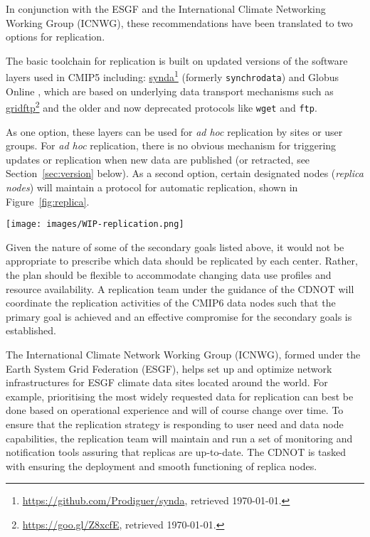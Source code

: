 \documentclass[gmd,manuscript]{copernicus}
\newcommand{\urlref}[2] {\href{#1}{#2}\footnote{\url{#1}, retrieved \today.}}
\begin{document}
In conjunction with the ESGF and the International Climate Networking
Working Group (ICNWG), these recommendations have been translated to
two options for replication.

The basic toolchain for replication is built on updated versions of
the software layers used in CMIP5 including:
\urlref{https://github.com/Prodiguer/synda}{synda} (formerly
\texttt{synchrodata}) and Globus Online \citep{ref:chardetal2015}, which
are based on underlying data transport mechanisms such as
\urlref{https://goo.gl/Z8xcfE}{gridftp} and the older and now deprecated
protocols like \texttt{wget} and \texttt{ftp}.

As one option, these layers can be used for \emph{ad hoc} replication by
sites or user groups. For \emph{ad hoc} replication, there is no
obvious mechanism for triggering updates or replication when new data
are published (or retracted, see Section~\ref{sec:version} below).
As a second option, certain designated nodes (\emph{replica nodes}) will maintain a protocol
for automatic replication, shown in Figure~\ref{fig:replica}.

\begin{figure*}
  \begin{center}
    \texttt{[image: images/WIP-replication.png]}
  \end{center}
  \caption{CMIP6 replication from data nodes to replica centers and
    between replica centers coordinated by a CMIP6 replication team,
    under the guidance of the CDNOT.}
  \label{fig:replica}
\end{figure*}

Given the nature of some of the secondary goals listed above, it would
not be appropriate to prescribe which data should be replicated by
each center. Rather, the plan should be flexible to accommodate
changing data use profiles and resource availability.
A replication team under the guidance of the CDNOT will coordinate the
replication activities of the CMIP6 data nodes such that the primary
goal is achieved and an effective compromise for the secondary goals
is established.

The International Climate Network Working Group (ICNWG), formed under
the Earth System Grid Federation (ESGF), helps set up and optimize
network infrastructures for ESGF climate data sites located around the
world. For example, prioritising the most widely requested data for
replication can best be done based on operational experience and will
of course change over time. To ensure that the replication strategy is
responding to user need and data node capabilities, the replication
team will maintain and run a set of monitoring and notification tools
assuring that replicas are up-to-date. The CDNOT is tasked with
ensuring the deployment and smooth functioning of replica nodes.
\end{document}
